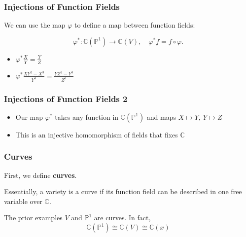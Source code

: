 \documentclass{beamer}
\theoremstyle{definition}
\begin{document}
\begin{frame}
    \frametitle{Injections of Function Fields}
    We can use the map \(\varphi\) to define a map between function fields:

   \[\varphi^\ast : \mathbb{C}(\mathbb{P}^1) \to \mathbb{C}(V), \quad \varphi^\ast f = f \circ \varphi.\]
   \begin{center}
\end{center}

\begin{itemize}
    \item[\textrightarrow] \(\varphi^\ast \frac{X}{Y} = \frac{Y}{Z}\)
    \item[\textrightarrow] \(\varphi^\ast \frac{XY^2 - X^3}{Y^3} = \frac{YZ^2 - Y^3}{Z^3}\)
\end{itemize}
\end{frame}
\begin{frame}
    \frametitle{Injections of Function Fields 2}
    \begin{itemize}
        \item Our map \(\varphi^\ast\) takes any function in \(\mathbb{C}(\mathbb{P}^1)\) and maps \(X\mapsto Y\), \(Y\mapsto Z\)
        \item This is an injective homomorphism of fields that fixes \(\mathbb{C}\)
    
    \end{itemize}

    \end{frame}

    \begin{frame}
        \frametitle{Curves}
        First, we define \textbf{curves}.

        Essentially, a variety is a curve if its function field can be described in one free variable over \(\mathbb{C}\).

       The prior examples \(V\) and \(\mathbb{P}^1\) are curves. In fact,  \[ \mathbb{C}(\mathbb{P}^1) \cong \mathbb{C}(V) \cong \mathbb{C}(x)\] 

    \end{frame}
\end{document}
